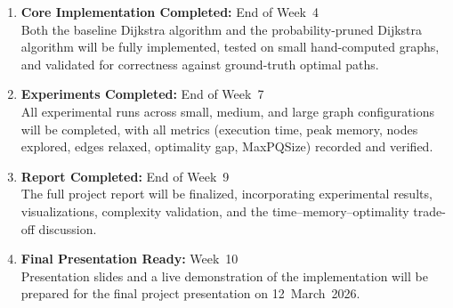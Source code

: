 \begin{enumerate}
    \item \textbf{Core Implementation Completed:} End of Week~4\\
    Both the baseline Dijkstra algorithm and the probability-pruned Dijkstra algorithm will be fully implemented, tested on small hand-computed graphs, and validated for correctness against ground-truth optimal paths.

    \item \textbf{Experiments Completed:} End of Week~7\\
    All experimental runs across small, medium, and large graph configurations will be completed, with all metrics (execution time, peak memory, nodes explored, edges relaxed, optimality gap, MaxPQSize) recorded and verified.

    \item \textbf{Report Completed:} End of Week~9\\
    The full project report will be finalized, incorporating experimental results, visualizations, complexity validation, and the time--memory--optimality trade-off discussion.

    \item \textbf{Final Presentation Ready:} Week~10\\
    Presentation slides and a live demonstration of the implementation will be prepared for the final project presentation on 12~March~2026.
\end{enumerate}
